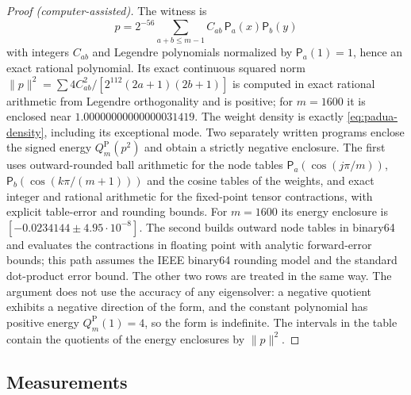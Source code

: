\documentclass[preprint,12pt,a4paper]{elsarticle}
\theoremstyle{remark}
\newcommand{\Pa}{\mathrm P}
\begin{document}
\begin{proof}[Proof (computer-assisted)]
The witness is
\[
 p=2^{-56}\sum_{a+b\le m-1}C_{ab}\,\mathsf P_a(x)\mathsf P_b(y)
\]
with integers $C_{ab}$ and Legendre polynomials normalized by $\mathsf P_a(1)=1$, hence an exact
rational polynomial. Its exact continuous squared norm
$\|p\|^2=\sum4C_{ab}^2/[2^{112}(2a+1)(2b+1)]$ is computed in exact rational arithmetic
from Legendre orthogonality and is positive; for $m=1600$ it is enclosed near
$1.00000000000000031419$. The weight density is exactly
\eqref{eq:padua-density}, including its exceptional mode. Two separately written
programs enclose the signed energy $Q_m^\Pa(p^2)$ and obtain a strictly negative
enclosure. The first uses outward-rounded ball arithmetic for the node tables
$\mathsf P_a(\cos(j\pi/m))$, $\mathsf P_b(\cos(k\pi/(m+1)))$ and the cosine tables of the weights,
and exact integer and rational arithmetic for the fixed-point tensor
contractions, with explicit table-error and rounding bounds. For $m=1600$ its
energy enclosure is $[-0.0234144\pm4.95\cdot10^{-8}]$. The second builds
outward node tables in binary64 and evaluates the contractions in floating
point with analytic forward-error bounds; this path assumes the IEEE binary64
rounding model and the standard dot-product error bound. The other two rows
are treated in the same way. The argument does not use the accuracy of any eigensolver: a negative
quotient exhibits a negative direction of the form, and the constant polynomial
has positive energy $Q_m^\Pa(1)=4$, so the form is indefinite. The intervals in the
table contain the quotients of the energy enclosures by $\|p\|^2$.
\end{proof}

\subsection{Measurements}\label{sec:measured}
\end{document}
